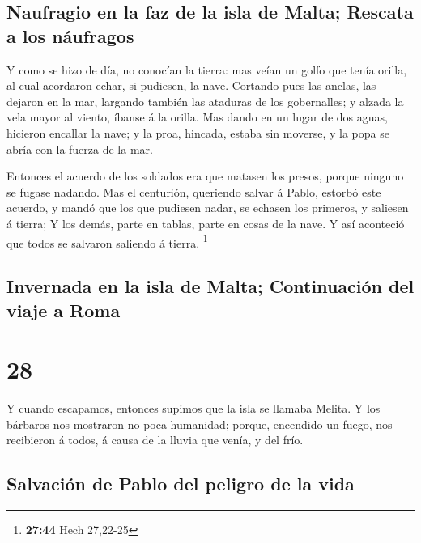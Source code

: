 \hypertarget{naufragio-en-la-faz-de-la-isla-de-malta-rescata-a-los-nuxe1ufragos}{%
\subsection{Naufragio en la faz de la isla de Malta; Rescata a los
náufragos}\label{naufragio-en-la-faz-de-la-isla-de-malta-rescata-a-los-nuxe1ufragos}}

 Y como se hizo de día, no conocían la tierra: mas veían
un golfo que tenía orilla, al cual acordaron echar, si pudiesen, la
nave.  Cortando pues las anclas, las dejaron en la mar,
largando también las ataduras de los gobernalles; y alzada la vela mayor
al viento, íbanse á la orilla.  Mas dando en un lugar de
dos aguas, hicieron encallar la nave; y la proa, hincada, estaba sin
moverse, y la popa se abría con la fuerza de la mar.

 Entonces el acuerdo de los soldados era que matasen los
presos, porque ninguno se fugase nadando.  Mas el
centurión, queriendo salvar á Pablo, estorbó este acuerdo, y mandó que
los que pudiesen nadar, se echasen los primeros, y saliesen á tierra;
 Y los demás, parte en tablas, parte en cosas de la nave.
Y así aconteció que todos se salvaron saliendo á tierra. \footnote{\textbf{27:44}
  Hech 27,22-25}

\hypertarget{invernada-en-la-isla-de-malta-continuaciuxf3n-del-viaje-a-roma}{%
\subsection{Invernada en la isla de Malta; Continuación del viaje a
Roma}\label{invernada-en-la-isla-de-malta-continuaciuxf3n-del-viaje-a-roma}}

\hypertarget{section-27}{%
\section{28}\label{section-27}}

 Y cuando escapamos, entonces supimos que la isla se
llamaba Melita.  Y los bárbaros nos mostraron no poca
humanidad; porque, encendido un fuego, nos recibieron á todos, á causa
de la lluvia que venía, y del frío.

\hypertarget{salvaciuxf3n-de-pablo-del-peligro-de-la-vida}{%
\subsection{Salvación de Pablo del peligro de la
vida}\label{salvaciuxf3n-de-pablo-del-peligro-de-la-vida}}

